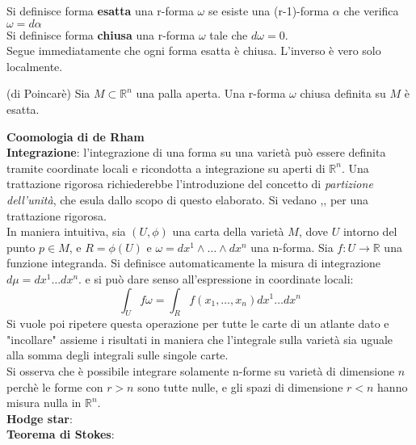 Si definisce forma \textbf{esatta} una r-forma $\omega$ se esiste una
(r-1)-forma $\alpha$ che verifica $\omega = d\alpha$\\
Si definisce forma \textbf{chiusa} una r-forma $\omega$ tale che $d\omega = 0$.\\
Segue immediatamente che ogni forma esatta è chiusa. L'inverso è vero solo localmente.
\begin{lemma}{(di Poincarè)}
    Sia $M \subset \mathbb{R}^n$ una palla aperta. Una r-forma $\omega$ chiusa
    definita su $M$ è esatta.
\end{lemma}
\textbf{Coomologia di de Rham}\\
\textbf{Integrazione}: l'integrazione di una forma su una varietà può essere definita
tramite coordinate locali e ricondotta a integrazione su aperti di $\mathbb{R}^n$.
Una trattazione rigorosa richiederebbe l'introduzione del concetto di \emph{partizione dell'unità},
che esula dallo scopo di questo elaborato. Si vedano \cite{},\cite{},\cite{} per
una trattazione rigorosa. \\
In maniera intuitiva, sia $(U,\phi)$ una carta della
varietà $M$, dove $U$ intorno del punto $p \in M$, e $R = \phi(U)$ e
$\omega = dx^1 \wedge \dots \wedge dx^n$ una n-forma.
Sia $f : U \to \mathbb{R}$ una funzione integranda.
Si definisce automaticamente la misura di integrazione $d\mu = dx^1 \dots dx^n$.
e si può dare senso all'espressione in coordinate locali:
$$
   \int_U f\omega = \int_R f(x_1,\dots,x_n) dx^1 \dots dx ^n
$$
Si vuole poi ripetere questa operazione per tutte le carte di un atlante dato e
"incollare" assieme i risultati in maniera che l'integrale sulla varietà sia uguale
alla somma degli integrali sulle singole carte.\\

Si osserva che è possibile integrare solamente n-forme su varietà di dimensione $n$
perchè le forme con $r>n$ sono tutte nulle, e gli spazi di dimensione $r<n$ hanno
misura nulla in $\mathbb{R}^n$.\\

\textbf{Hodge star}:\\
\textbf{Teorema di Stokes}:\\
